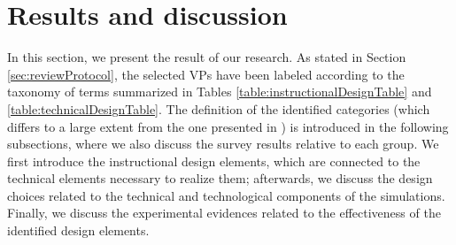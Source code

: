 \section{Results and discussion}
\label{sec:taxonomy}


In this section, we present the result of our research. As stated in Section \ref{sec:reviewProtocol}, the selected VPs have been labeled according to the taxonomy of terms summarized in Tables \ref{table:instructionalDesignTable} and \ref{table:technicalDesignTable}. The definition of the identified categories (which differs to a large extent from the one presented in \cite{lee2020effective}) is introduced in the following subsections, where we also discuss the survey results relative to each group. We first introduce the instructional design elements, which are connected to the technical elements necessary to realize them; afterwards, we discuss the design choices related to the technical and technological components of the simulations. Finally, we discuss the experimental evidences related to the effectiveness of the identified design elements.








% 
% 


